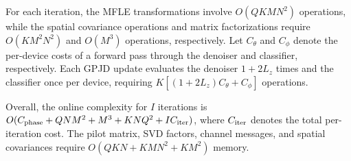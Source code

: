 For each iteration, the MFLE transformations involve $O(QKMN^2)$
operations, while the spatial covariance operations and matrix
factorizations require $O(KM^2N^2)$ and $O(M^3)$ operations,
respectively. Let $C_\theta$ and $C_\phi$ denote the per-device costs of a forward
pass through the denoiser and classifier, respectively. Each GPJD
update evaluates the denoiser $1+2L_z$ times and the classifier once
per device, requiring $K[(1+2L_z)C_\theta+C_\phi]$ operations.

Overall, the online complexity for $I$ iterations is
$O(C_{\rm phase}+QNM^2+M^3+KNQ^2+I C_{\rm iter})$, where
$C_{\rm iter}$ denotes the total per-iteration cost.
The pilot matrix, SVD factors, channel messages, and spatial
covariances require $O(QKN+KMN^2+KM^2)$ memory.
